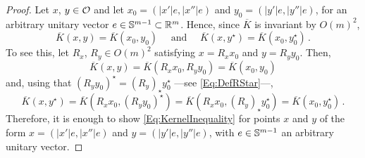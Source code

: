 \begin{proof}
Let $x$, $y \in \mathcal{O}$ and let $x_0 = (|x'|e, |x''|e)$ and $y_0 = (|y'|e, |y''|e)$, for an arbitrary unitary vector $e \in \mathbb{S}^{m-1} \subset \mathbb{R}^m$. Hence, since $\overline{K}$ is invariant by $O(m)^2$,
$$
\overline{K}(x,y) = \overline{K}(x_0, y_0) \quad \text{ and } \quad \overline{K}(x,y^\star) = \overline{K}(x_0, y_0^\star)\,.
$$
To see this, let $R_x$, $R_y \in O(m)^2$ satisfying $x = R_x x_0$ and $y = R_y y_0$. Then,
$$
\overline{K}(x,y) = \overline{K}(R_x x_0,R_y y_0)  = \overline{K}(x_0, y_0)
$$
and, using that $(R_y y_0)^\star = (R_y)_\star y_0^\star$ ---see \eqref{Eq:DefRStar}---,
$$
\overline{K}(x,y^\star) = \overline{K}(R_x x_0,(R_y y_0)^\star) = \overline{K}(R_x x_0,(R_y)_\star y_0^\star)  = \overline{K}(x_0, y_0^\star)\,.
$$
Therefore, it is enough to show \eqref{Eq:KernelInequality} for points $x$ and $y$ of the form $x = (|x'|e, |x''|e)$ and $y = (|y'|e, |y''|e)$, with $e \in \mathbb{S}^{m-1}$ an arbitrary unitary vector.


\end{proof}
